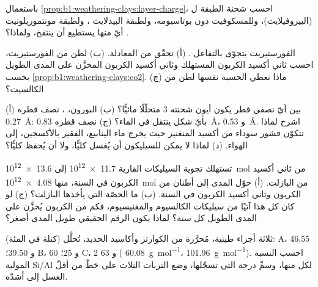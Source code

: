 \begin{exercise}[$\star\star$]\label{exo:b1:weathering-clays:8}
باستعمال \cref{prop:b1:weathering-clays:layer-charge}، احسب شحنة الطبقة ل (البيروفيلايت)، وللمسكوفيت  دون بوتاسيومه، ولطبقة البيدلايت ، ولطبقة مونتموريلونيت . أيّ منها يستطيع أن ينتفخ، ولماذا؟
\end{exercise}

\begin{exercise}[$\star\star$]\label{exo:b1:weathering-clays:9}
الفورستيريت  يتجوّى بالتفاعل
. (أ) تحقّق من المعادلة. (ب) لطن من الفورستيريت، احسب ثاني أكسيد الكربون المستهلك وثاني أكسيد الكربون المخزَّن على المدى الطويل بحسب \cref{prop:b1:weathering-clays:co2}. (ج) ماذا تعطي الحسبة نفسها لطن من الكالسيت؟
\end{exercise}

\begin{exercise}[$\star\star\star$]\label{exo:b1:weathering-clays:10}
(أ) بين أيّ نصفي قطر يكون أيون شحنته 3 متحلّلًا مائيًّا؟ (ب) البورون، ، نصف قطره \qty{0.27}{\angstrom}: بأيّ شكل ينتقل في الماء؟ (ج)  نصف قطره \qty{0.83}{\angstrom}، و \qty{0.53}{\angstrom}. اشرح لماذا تتكوّن قشور سوداء من أكسيد المنغنيز حيث يخرج ماء الينابيع، الفقير بالأكسجين، إلى الهواء. (د) لماذا لا يمكن للسيليكون أن يُغسل كليًّا، ولا أن يُحفظ كليًّا؟
\end{exercise}

\begin{exercise}[$\star\star\star$]\label{exo:b1:weathering-clays:11}
تستهلك تجوية السيليكات القارية \num{11.7e12} إلى \qty{13.6e12}{mol} من ثاني أكسيد الكربون في السنة، منها \qty{4.08e12}{mol} من البازلت. (أ) حوّل المدى إلى أطنان من الكربون وثاني أكسيد الكربون في السنة. (ب) ما الحصّة التي يأخذها البازلت؟ (ج) لو كان كل هذا آتيًا من سيليكات الكالسيوم والمغنيسيوم، فكم من الكربون يُخزَّن على المدى الطويل كل سنة؟ لماذا يكون الرقم الحقيقي طويل المدى أصغر؟
\end{exercise}

\begin{exercise}[$\star\star\star$]\label{exo:b1:weathering-clays:12}
ثلاثة أجزاء طينية، مُحرَّرة من الكوارتز وأكاسيد الحديد، تُحلَّل (كتلة في المئة): A،  \num{46.55} و \num{39.50}؛ B،  60 و 25؛ C،  2 و 63 (
\qty{60.08}{g.mol^{-1}}،  \qty{101.96}{g.mol^{-1}}). احسب النسبة المولية Si/Al لكل منها، وسمِّ درجة  التي تسجّلها، وضع التربات الثلاث على خطّ من أقلّ الغسل إلى أشدّه.
\end{exercise}

